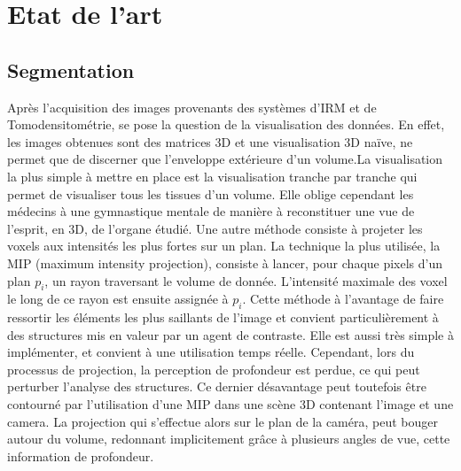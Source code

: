 %
\chapter{Etat de l'art}



\section{Segmentation}
\label{sec:EA:segmentation}


Après l'acquisition des images provenants des systèmes d'IRM et de Tomodensitométrie, se pose la question de la visualisation des données. En effet, les images obtenues sont des matrices 3D et une visualisation 3D naïve, ne permet que de discerner que l'enveloppe extérieure d'un volume.La visualisation la plus simple à mettre en place est la visualisation tranche par tranche qui permet de visualiser tous les tissues d'un volume. Elle oblige cependant les médecins à une gymnastique mentale de manière à reconstituer une vue de l'esprit, en 3D, de l'organe étudié. Une autre méthode consiste à projeter les voxels aux intensités les plus fortes sur un plan. La technique la plus utilisée, la MIP (maximum intensity projection), consiste à lancer, pour chaque pixels d'un plan $p_i$, un rayon traversant le volume de donnée. L'intensité maximale des voxel le long de ce rayon est ensuite assignée à $p_i$. Cette méthode à l'avantage de faire ressortir les éléments les plus saillants de l'image et convient particulièrement à des structures mis en valeur par un agent de contraste. Elle est aussi très simple à implémenter, et convient à une utilisation temps réelle. Cependant, lors du processus de projection, la perception de profondeur est perdue, ce qui peut perturber l'analyse des structures. Ce dernier désavantage peut toutefois être contourné par l'utilisation d'une MIP dans une scène 3D contenant l'image et une camera. La projection qui s'effectue alors sur le plan de la caméra, peut bouger autour du volume, redonnant implicitement grâce à plusieurs angles de vue, cette information de profondeur.

